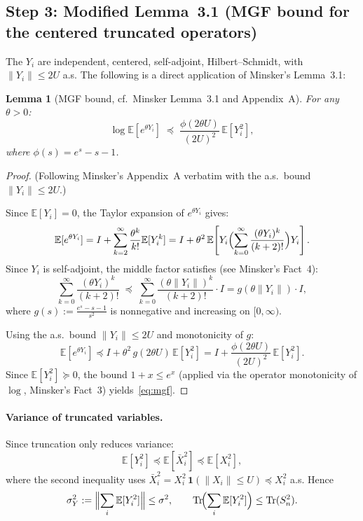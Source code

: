 \documentclass[11pt]{article}
\newtheorem{lemma}[theorem]{Lemma}
\DeclareMathOperator{\Tr}{Tr}
\newcommand{\E}{\mathbb{E}}
\newcommand{\norm}[1]{\|#1\|}
\begin{document}
\subsection*{Step 3: Modified Lemma~3.1 (MGF bound for the centered truncated operators)}

The $Y_i$ are independent, centered, self-adjoint, Hilbert--Schmidt, with $\norm{Y_i}\leq 2U$ a.s. The following is a direct application of Minsker's Lemma~3.1:

\begin{lemma}[MGF bound, cf.\ Minsker Lemma~3.1 and Appendix~A]\label{lem:mgf}
For any $\theta>0$:
\begin{equation}\label{eq:mgf}
\log \E[e^{\theta Y_i}] \;\preceq\; \frac{\phi(2\theta U)}{(2U)^2}\,\E[Y_i^2],
\end{equation}
where $\phi(s)=e^s-s-1$.
\end{lemma}

\begin{proof}
(Following Minsker's Appendix~A verbatim with the a.s.\ bound $\norm{Y_i}\leq 2U$.)

Since $\E[Y_i]=0$, the Taylor expansion of $e^{\theta Y_i}$ gives:
\[
\E[e^{\theta Y_i}]
= I + \sum_{k=2}^\infty \frac{\theta^k}{k!}\E[Y_i^k]
= I + \theta^2\,\E\!\left[Y_i\Bigl(\sum_{k=0}^\infty\frac{(\theta Y_i)^k}{(k+2)!}\Bigr)Y_i\right].
\]
Since $Y_i$ is self-adjoint, the middle factor satisfies (see Minsker's Fact~4):
\[
\sum_{k=0}^\infty\frac{(\theta Y_i)^k}{(k+2)!}
\;\preceq\; \sum_{k=0}^\infty\frac{(\theta\norm{Y_i})^k}{(k+2)!}\cdot I
= g(\theta\norm{Y_i})\cdot I,
\]
where $g(s):=\frac{e^s-s-1}{s^2}$ is nonnegative and increasing on $[0,\infty)$.

Using the a.s.\ bound $\norm{Y_i}\leq 2U$ and monotonicity of $g$:
\[
\E[e^{\theta Y_i}]\preceq I+\theta^2\,g(2\theta U)\,\E[Y_i^2]
= I + \frac{\phi(2\theta U)}{(2U)^2}\,\E[Y_i^2].
\]
Since $\E[Y_i^2]\succeq 0$, the bound $1+x\leq e^x$ (applied via the operator monotonicity of $\log$, Minsker's Fact~3) yields~\eqref{eq:mgf}.
\end{proof}

\paragraph{Variance of truncated variables.}
Since truncation only reduces variance:
\begin{equation}\label{eq:var_trunc}
\E[Y_i^2]\preceq \E[\bar X_i^2]\preceq \E[X_i^2],
\end{equation}
where the second inequality uses $\bar X_i^2 = X_i^2\,\mathbf{1}(\norm{X_i}\leq U)\preceq X_i^2$ a.s. Hence
\[
\sigma_Y^2:=\Bigl\|\sum_i\E[Y_i^2]\Bigr\|\leq \sigma^2,\qquad
\Tr\!\Bigl(\sum_i\E[Y_i^2]\Bigr)\leq\Tr(S_n^2).
\]
\end{document}
